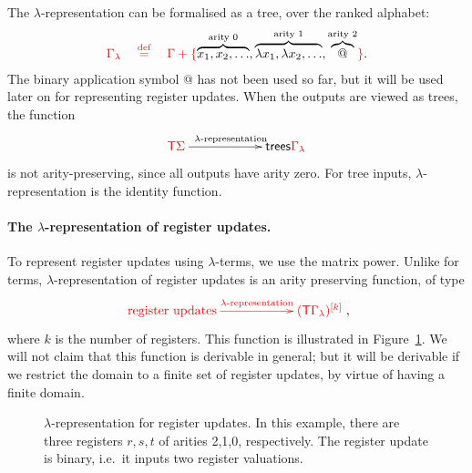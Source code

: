 The  $\lambda$-representation can be formalised as a tree, over the ranked alphabet:
\begin{align*}
{\color{red}{ \Gamma_\lambda \quad \stackrel{\text{def}}=\quad \Gamma + \{{\color{black}{\overbrace{x_1,x_2,\ldots}^\text{arity 0},\overbrace{\lambda x_1,\lambda x_2,\ldots}^\text{arity 1}, \overbrace{@}^{\text{arity 2}}}}\}}}.
\end{align*}
The binary application symbol @ has  not been used so far, but it will be used later on for representing register updates.
When the outputs are viewed as trees, the function
\begin{align}\label{eq:lambda-representation-term}
\xymatrix@C=2cm{
    \tmonad \rSigma 
    \ar[r]^{\text{$\lambda$-representation}} &
    \trees {\ranked{\Gamma_\lambda}}
}
\end{align}
is not arity-preserving, since all outputs have arity zero. For tree inputs, $\lambda$-representation is the identity function. 

\paragraph*{The $\lambda$-representation of register updates.} To represent register updates using $\lambda$-terms, we use  the matrix power. Unlike for terms,    $\lambda$-representation of register updates is an  arity preserving function, of type
\begin{align}\label{eq:lambda-representation-regup}
\ranked{
    \xymatrix@C=2cm{
 \text{register updates}    \ar[r]^-{\text{$\lambda$-representation}} &
 \mati k {(\tmonad\Gamma_\lambda)}
}
},
\end{align}
where $k$ is the number of registers. This function is illustrated in Figure~\ref{fig:labmda-representation-for-register-updates}. 
We will not claim that this function is derivable in general; but it will be derivable if we restrict the domain to a finite set of register updates, by virtue of having a finite domain.

\begin{figure}[]
    \centering
{}    
    \caption{$\lambda$-representation for register updates. In this example, there are three registers $r,s,t$ of arities 2,1,0, respectively. The register update is binary, i.e.~it inputs two register valuations.}
    \label{fig:labmda-representation-for-register-updates}
\end{figure}

